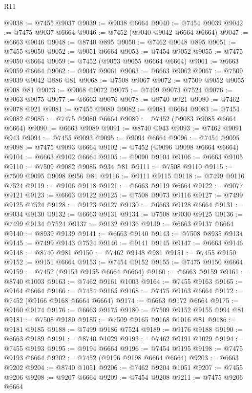 \begin{lexlean}{R11}
\begin{coremodule}
@9038 := @7455 @9037
@9039 := @9038 @6664
@9040 := @7454 @9039
@9042 := @7475 @9037 @6664
@9046 := @7452 (@9040 @9042 @6664 @6664)
@9047 := @6663 @9046
@9048 := @8740 @895
@9050 := @7462 @9048 @895
@9051 := @7455 @9050
@9052 := @9051 @6664
@9053 := @7454 @9052
@9055 := @7475 @9050 @6664
@9059 := @7452 (@9053 @9055 @6664 @6664)
@9061 := @6663 @9059 @6664
@9062 := @9047 @9061
@9063 := @6663 @9062
@9067 := @7509 @9039 @9042 @886 @81
@9068 := @7508 @9067
@9072 := @7509 @9052 @9055 @908 @81
@9073 := @9068 @9072
@9075 := @7499 @9073 @7524
@9076 := @9063 @9075
@9077 := @6663 @9076
@9078 := @8740 @921
@9080 := @7462 @9078 @921
@9081 := @7455 @9080
@9082 := @9081 @6664
@9083 := @7454 @9082
@9085 := @7475 @9080 @6664
@9089 := @7452 (@9083 @9085 @6664 @6664)
@9090 := @6663 @9089
@9091 := @8740 @943
@9093 := @7462 @9091 @943
@9094 := @7455 @9093
@9095 := @9094 @6664
@9096 := @7454 @9095
@9098 := @7475 @9093 @6664
@9102 := @7452 (@9096 @9098 @6664 @6664)
@9104 := @6663 @9102 @6664
@9105 := @9090 @9104
@9106 := @6663 @9105
@9110 := @7509 @9082 @9085 @934 @81
@9111 := @7508 @9110
@9115 := @7509 @9095 @9098 @956 @81
@9116 := @9111 @9115
@9118 := @7499 @9116 @7524
@9119 := @9106 @9118
@9121 := @6663 @9119 @6664
@9122 := @9077 @9121
@9123 := @6663 @9122
@9125 := @7508 @9073 @9116
@9127 := @7499 @9125 @7524
@9128 := @9123 @9127
@9130 := @6663 @9128 @6664
@9131 := @9034 @9130
@9132 := @6663 @9131
@9134 := @7508 @9030 @9125
@9136 := @7499 @9134 @7524
@9137 := @9132 @9136
@9139 := @6663 @9137 @6664
@9140 := @8939 @9139
@9141 := @6663 @9140
@9143 := @7508 @8935 @9134
@9145 := @7499 @9143 @7524
@9146 := @9141 @9145
@9147 := @6663 @9146
@9148 := @8740 @981
@9150 := @7462 @9148 @981
@9151 := @7455 @9150
@9152 := @9151 @6664
@9153 := @7454 @9152
@9155 := @7475 @9150 @6664
@9159 := @7452 (@9153 @9155 @6664 @6664)
@9160 := @6663 @9159
@9161 := @8740 @1003
@9163 := @7462 @9161 @1003
@9164 := @7455 @9163
@9165 := @9164 @6664
@9166 := @7454 @9165
@9168 := @7475 @9163 @6664
@9172 := @7452 (@9166 @9168 @6664 @6664)
@9174 := @6663 @9172 @6664
@9175 := @9160 @9174
@9176 := @6663 @9175
@9180 := @7509 @9152 @9155 @994 @81
@9181 := @7508 @9180
@9185 := @7509 @9165 @9168 @1016 @81
@9186 := @9181 @9185
@9188 := @7499 @9186 @7524
@9189 := @9176 @9188
@9190 := @6663 @9189
@9191 := @8740 @1029
@9193 := @7462 @9191 @1029
@9194 := @7455 @9193
@9195 := @9194 @6664
@9196 := @7454 @9195
@9198 := @7475 @9193 @6664
@9202 := @7452 (@9196 @9198 @6664 @6664)
@9203 := @6663 @9202
@9204 := @8740 @1051
@9206 := @7462 @9204 @1051
@9207 := @7455 @9206
@9208 := @9207 @6664
@9209 := @7454 @9208
@9211 := @7475 @9206 @6664

\end{coremodule}
\end{lexlean}
